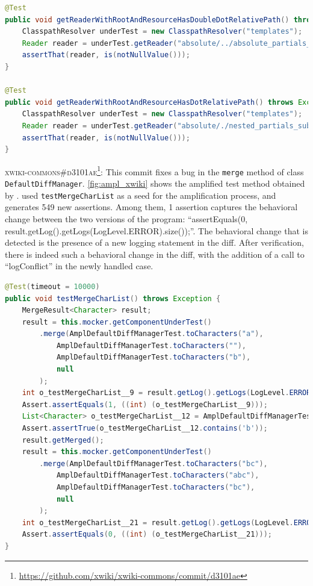 \begin{lstlisting}[float,language=java,caption=Developer test for \textsc{774ae7a} of Mustache.java.,label=fig:diff_mustache]
@Test
public void getReaderWithRootAndResourceHasDoubleDotRelativePath() throws Exception {
	ClasspathResolver underTest = new ClasspathResolver("templates");
	Reader reader = underTest.getReader("absolute/../absolute_partials_template.html");
	assertThat(reader, is(notNullValue()));
}

@Test
public void getReaderWithRootAndResourceHasDotRelativePath() throws Exception {
	ClasspathResolver underTest = new ClasspathResolver("templates");
	Reader reader = underTest.getReader("absolute/./nested_partials_sub.html");
	assertThat(reader, is(notNullValue()));
}
\end{lstlisting}

\textsc{xwiki-commons\#d3101ae}\footnote{\url{https://github.com/xwiki/xwiki-commons/commit/d3101ae}}: This commit fixes a bug in the \texttt{merge} method of class \texttt{DefaultDiffManager}.
\autoref{fig:ampl_xwiki} shows the amplified test method obtained by \DCIA.
\DCI used \texttt{testMergeCharList} as a seed for the amplification process, and generates 549 new assertions.
Among them, 1 assertion captures the behavioral change between the two versions of the program: 
``assertEquals(0, result.getLog().getLogs(LogLevel.ERROR).size());''.
The behavioral change that is detected is the presence of a new logging statement in the diff. 
After verification, there is indeed such a behavioral change in the diff, with the addition of a call to ``logConflict'' in the newly handled case.

\begin{lstlisting}[float,language=java,caption=Test generated by \DCIA that detects the behavioral change of \textsc{d3101ae} of XWiki.,label=fig:ampl_xwiki]
@Test(timeout = 10000)
public void testMergeCharList() throws Exception {
	MergeResult<Character> result;
	result = this.mocker.getComponentUnderTest()
		.merge(AmplDefaultDiffManagerTest.toCharacters("a"), 
			AmplDefaultDiffManagerTest.toCharacters(""), 
			AmplDefaultDiffManagerTest.toCharacters("b"), 
			null
		);
	int o_testMergeCharList__9 = result.getLog().getLogs(LogLevel.ERROR).size();
	Assert.assertEquals(1, ((int) (o_testMergeCharList__9)));
	List<Character> o_testMergeCharList__12 = AmplDefaultDiffManagerTest.toCharacters("b");
	Assert.assertTrue(o_testMergeCharList__12.contains('b'));
	result.getMerged();
	result = this.mocker.getComponentUnderTest()
		.merge(AmplDefaultDiffManagerTest.toCharacters("bc"), 
			AmplDefaultDiffManagerTest.toCharacters("abc"), 
			AmplDefaultDiffManagerTest.toCharacters("bc"), 
			null
		);
	int o_testMergeCharList__21 = result.getLog().getLogs(LogLevel.ERROR).size();
	Assert.assertEquals(0, ((int) (o_testMergeCharList__21)));
}
\end{lstlisting}

